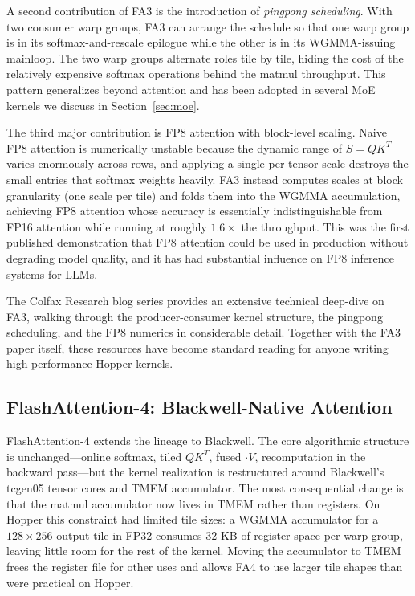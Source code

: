 \documentclass[10pt]{article}
\begin{document}
A second contribution of FA3 is the introduction of \emph{pingpong scheduling}. With two consumer warp groups, FA3 can arrange the schedule so that one warp group is in its softmax-and-rescale epilogue while the other is in its WGMMA-issuing mainloop. The two warp groups alternate roles tile by tile, hiding the cost of the relatively expensive softmax operations behind the matmul throughput. This pattern generalizes beyond attention and has been adopted in several MoE kernels we discuss in Section~\ref{sec:moe}.

The third major contribution is FP8 attention with block-level scaling. Naive FP8 attention is numerically unstable because the dynamic range of $S = QK^T$ varies enormously across rows, and applying a single per-tensor scale destroys the small entries that softmax weights heavily. FA3 instead computes scales at block granularity (one scale per tile) and folds them into the WGMMA accumulation, achieving FP8 attention whose accuracy is essentially indistinguishable from FP16 attention while running at roughly $1.6\times$ the throughput. This was the first published demonstration that FP8 attention could be used in production without degrading model quality, and it has had substantial influence on FP8 inference systems for LLMs.

The Colfax Research blog series \citep{colfax2024fa3} provides an extensive technical deep-dive on FA3, walking through the producer-consumer kernel structure, the pingpong scheduling, and the FP8 numerics in considerable detail. Together with the FA3 paper itself, these resources have become standard reading for anyone writing high-performance Hopper kernels.

\subsection{FlashAttention-4: Blackwell-Native Attention}
\label{sec:fa4}

FlashAttention-4 \citep{flashattention4} extends the lineage to Blackwell. The core algorithmic structure is unchanged---online softmax, tiled $QK^T$, fused $\cdot V$, recomputation in the backward pass---but the kernel realization is restructured around Blackwell's tcgen05 tensor cores and TMEM accumulator. The most consequential change is that the matmul accumulator now lives in TMEM rather than registers. On Hopper this constraint had limited tile sizes: a WGMMA accumulator for a $128 \times 256$ output tile in FP32 consumes 32 KB of register space per warp group, leaving little room for the rest of the kernel. Moving the accumulator to TMEM frees the register file for other uses and allows FA4 to use larger tile shapes than were practical on Hopper.
\end{document}
